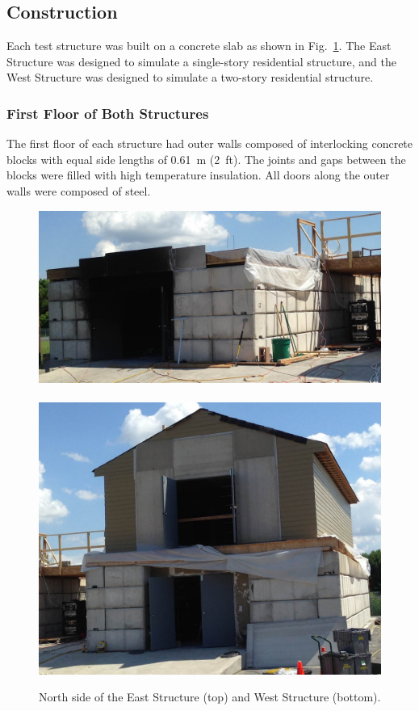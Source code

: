 \documentclass[12pt,oneside]{book}
\begin{document}
\subsection{Construction}
\label{sec:construction}
Each test structure was built on a concrete slab as shown in Fig.~\ref{fig:struct_pics}. The East Structure was designed to simulate a single-story residential structure, and the West Structure was designed to simulate a two-story residential structure.

\subsubsection{First Floor of Both Structures}
The first floor of each structure had outer walls composed of interlocking concrete blocks with equal side lengths of 0.61~m (2~ft). The joints and gaps between the blocks were filled with high temperature insulation. All doors along the outer walls were composed of steel.

\begin{figure}[!ht]
	\includegraphics[width=5.25in]{../../Hose_Stream_Tests/Figures/Pictures/east_structure}
	\\~\\
	\includegraphics[width=5.25in]{../../Hose_Stream_Tests/Figures/Pictures/west_structure}
	\caption[North side of the East and West Structures.]{North side of the East Structure (top) and West Structure (bottom).}
	\label{fig:struct_pics}
\end{figure}
\end{document}
